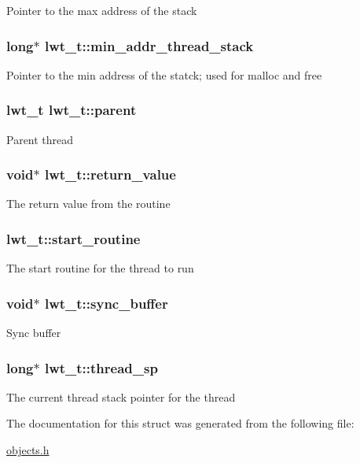 Pointer to the max address of the stack \hypertarget{structlwt_a62ea9a882e0a197b9b076e1e018048d7}{
\subsubsection[{min\+\_\+addr\+\_\+thread\+\_\+stack}]{\setlength{\rightskip}{0pt plus 5cm}long$\ast$ lwt\+\_\+t\+::min\+\_\+addr\+\_\+thread\+\_\+stack}}\label{structlwt_a62ea9a882e0a197b9b076e1e018048d7}
Pointer to the min address of the statck; used for malloc and free \hypertarget{structlwt_a1849cde569fc8f254db05365de570b0e}{
\subsubsection[{parent}]{\setlength{\rightskip}{0pt plus 5cm}lwt\+\_\+t lwt\+\_\+t\+::parent}}\label{structlwt_a1849cde569fc8f254db05365de570b0e}
Parent thread \hypertarget{structlwt_a22ac5beef8503481294035218e73c3ef}{
\subsubsection[{return\+\_\+value}]{\setlength{\rightskip}{0pt plus 5cm}void$\ast$ lwt\+\_\+t\+::return\+\_\+value}}\label{structlwt_a22ac5beef8503481294035218e73c3ef}
The return value from the routine \hypertarget{structlwt_acdcfc344e943154b9d3d11e1a41cb9f1}{
\subsubsection[{start\+\_\+routine}]{ lwt\+\_\+t\+::start\+\_\+routine}}\label{structlwt_acdcfc344e943154b9d3d11e1a41cb9f1}
The start routine for the thread to run \hypertarget{structlwt_ae78dc8102a1218ab1fcdd84815848716}{
\subsubsection[{sync\+\_\+buffer}]{\setlength{\rightskip}{0pt plus 5cm}void$\ast$ lwt\+\_\+t\+::sync\+\_\+buffer}}\label{structlwt_ae78dc8102a1218ab1fcdd84815848716}
Sync buffer \hypertarget{structlwt_aba48cdf2f962d7ededf74923ddd33ea1}{
\subsubsection[{thread\+\_\+sp}]{\setlength{\rightskip}{0pt plus 5cm}long$\ast$ lwt\+\_\+t\+::thread\+\_\+sp}}\label{structlwt_aba48cdf2f962d7ededf74923ddd33ea1}
The current thread stack pointer for the thread 

The documentation for this struct was generated from the following file\+:\begin{DoxyCompactItemize}
\item 
\hyperlink{objects_8h}{objects.\+h}\end{DoxyCompactItemize}
